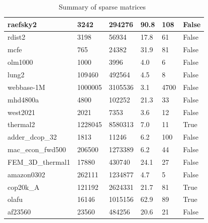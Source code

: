 \documentclass[12pt,oneside]{book} %
\begin{document}
\begin{table}[h]
\begin{tabular}{|l|l|l|l|l|l|}
        raefsky2             & 3242       & 294276      & 90.8             & 108              & False              \\ \hline
        rdist2               & 3198       & 56934       & 17.8             & 61               & False              \\ \hline
        mcfe                 & 765        & 24382       & 31.9             & 81               & False              \\ \hline
        olm1000              & 1000       & 3996        & 4.0              & 6                & False              \\ \hline
        lung2                & 109460     & 492564      & 4.5              & 8                & False              \\ \hline
        webbase-1M           & 1000005    & 3105536     & 3.1              & 4700             & False              \\ \hline
        mhd4800a             & 4800       & 102252      & 21.3             & 33               & False              \\ \hline
        west2021             & 2021       & 7353        & 3.6              & 12               & False              \\ \hline
        thermal2             & 1228045    & 8580313     & 7.0              & 11               & True               \\ \hline
        adder\_dcop\_32      & 1813       & 11246       & 6.2              & 100              & False              \\ \hline
        mac\_econ\_fwd500    & 206500     & 1273389     & 6.2              & 44               & False              \\ \hline
        FEM\_3D\_thermal1    & 17880      & 430740      & 24.1             & 27               & False              \\ \hline
        amazon0302           & 262111     & 1234877     & 4.7              & 5                & False              \\ \hline
        cop20k\_A            & 121192     & 2624331     & 21.7             & 81               & True               \\ \hline
        olafu                & 16146      & 1015156     & 62.9             & 89               & True               \\ \hline
        af23560              & 23560      & 484256      & 20.6             & 21               & False              \\ \hline
    \end{tabular}
    \caption{Summary of sparse matrices~\cite{10.1145/3017994}}
    \label{tab:matrix_summary}
\end{table}
\end{document}
